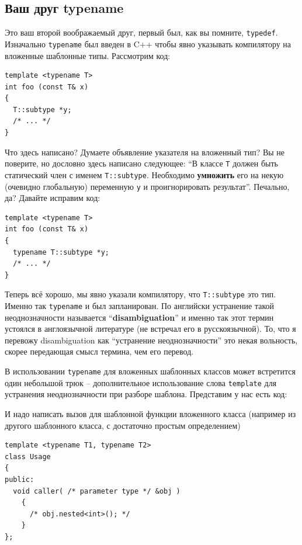 \documentclass[a4paper,12pt,oneside]{article}
\begin{document}
\subsection{Ваш друг typename}

Это ваш второй воображаемый друг, первый был, как вы помните, \lstinline!typedef!. Изначально \lstinline!typename! был введен в C++ чтобы явно указывать компилятору на вложенные шаблонные типы. Рассмотрим код:

\begin{lstlisting}
template <typename T>
int foo (const T& x)
{
  T::subtype *y;
  /* ... */
}
\end{lstlisting}

Что здесь написано? Думаете объявление указателя на вложенный тип? Вы не поверите, но дословно здесь написано 
следующее: ``В классе \lstinline!T! должен быть статический член с именем \lstinline!T::subtype!. Необходимо \textbf{умножить} его на некую (очевидно глобальную) переменную \lstinline!y! и проигнорировать результат''. Печально, да? Давайте исправим код:

\begin{lstlisting}
template <typename T>
int foo (const T& x)
{
  typename T::subtype *y;
  /* ... */
}
\end{lstlisting}

Теперь всё хорошо, мы явно указали компилятору, что \lstinline!T::subtype! это тип. Именно так \lstinline!typename! и был запланирован. По английски устранение такой неоднозначности называется ``\textbf{disambiguation}''  и именно так этот термин устоялся в англоязычной литературе (не встречал его в русскоязычной). То, что я перевожу disambiguation как ``устранение неоднозначности'' это некая вольность, скорее передающая смысл термина, чем его перевод.

В использовании \lstinline!typename! для вложенных шаблонных классов может встретится один небольшой трюк -- дополнительное использование слова \lstinline!template! для устранения неоднозначности при разборе шаблона. Представим у нас есть код:



И надо написать вызов для шаблонной функции вложенного класса (например из другого шаблонного класса, с достаточно простым определением)

\begin{lstlisting}
template <typename T1, typename T2>
class Usage
{
public:
  void caller( /* parameter type */ &obj )
    {
      /* obj.nested<int>(); */
    }
};
\end{lstlisting}
\end{document}
